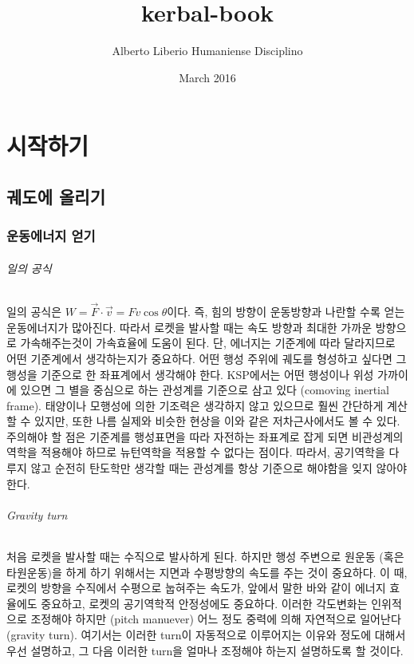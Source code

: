 \documentclass[9pt]{amsbook}
\title{kerbal-book}
\author{Alberto Liberio Humaniense Disciplino}
\date{March 2016}
\begin{document}
\maketitle
\sf

\tableofcontents
\part{시작하기}
\chapter{궤도에 올리기}
\section{운동에너지 얻기}
\paragraph{일의 공식}
일의 공식은 $W=\vec{F} \cdot \vec{v} = F v \cos\theta$이다. 
즉, 힘의 방향이 운동방향과 나란할 수록 얻는 운동에너지가 많아진다. 
따라서 로켓을 발사할 때는 속도 방향과 최대한 가까운 방향으로 가속해주는것이 가속효율에 도움이 된다.
단, 에너지는 기준계에 따라 달라지므로 어떤 기준계에서 생각하는지가 중요하다. 
어떤 행성 주위에 궤도를 형성하고 싶다면 그 행성을 기준으로 한 좌표계에서 생각해야 한다. 
KSP에서는 어떤 행성이나 위성 가까이에 있으면 그 별을 중심으로 하는 관성계를 기준으로 삼고 있다 (comoving inertial frame). 
태양이나 모행성에 의한 기조력은 생각하지 않고 있으므로 훨씬 간단하게 계산할 수 있지만, 또한 나름 실제와 비슷한 현상을 이와 같은 저차근사에서도 볼 수 있다. 
주의해야 할 점은 기준계를 행성표면을 따라 자전하는 좌표계로 잡게 되면 비관성계의 역학을 적용해야 하므로 뉴턴역학을 적용할 수 없다는 점이다. 
따라서, 공기역학을 다루지 않고 순전히 탄도학만 생각할 때는 관성계를 항상 기준으로 해야함을 잊지 않아야 한다.

\paragraph{Gravity turn}
처음 로켓을 발사할 때는 수직으로 발사하게 된다. 하지만 행성 주변으로 원운동 (혹은 타원운동)을 하게 하기 위해서는 지면과 수평방향의 속도를 주는 것이 중요하다. 
이 때, 로켓의 방향을 수직에서 수평으로 눕혀주는 속도가, 앞에서 말한 바와 같이 에너지 효율에도 중요하고, 로켓의 공기역학적 안정성에도 중요하다. 
이러한 각도변화는 인위적으로 조정해야 하지만 (pitch manuever) 어느 정도 중력에 의해 자연적으로 일어난다 (gravity turn).
여기서는 이러한 turn이 자동적으로 이루어지는 이유와 정도에 대해서 우선 설명하고, 그 다음 이러한 turn을 얼마나 조정해야 하는지 설명하도록 할 것이다.
\end{document}
